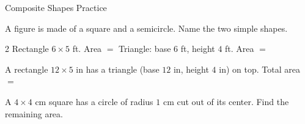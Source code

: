 
\newpage
\begin{stepPractice}{Composite Shapes Practice}
    \resetProblems

    \prob A figure is made of a square and a semicircle. Name the two simple shapes. \answerBlank[3cm]

    \begin{multicols}{2}
    \prob Rectangle $6 \times 5$ ft. Area $=$ \answerBlank[2cm]
    \prob Triangle: base $6$ ft, height $4$ ft. Area $=$ \answerBlank[2cm]
    \end{multicols}

    \prob A rectangle $12 \times 5$ in has a triangle (base $12$ in, height $4$ in) on top. Total area $=$ \answerBlank[2.5cm]

    \prob A $4 \times 4$ cm square has a circle of radius $1$ cm cut out of its center. Find the remaining area. \answerBlank[2.5cm]

\end{stepPractice}
